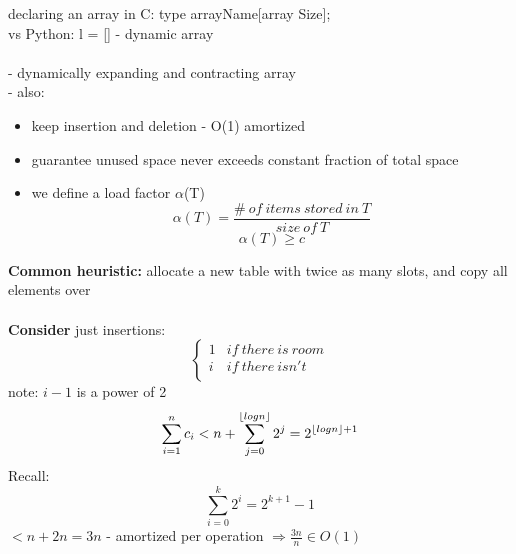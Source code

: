 \documentclass{article}
\DeclarePairedDelimiter\floor{\lfloor}{\rfloor}
\begin{document}
	declaring an array in C: type arrayName[array Size];\\
	vs Python: l = [] - dynamic array\\\\
	- dynamically expanding and contracting array\\ 
	- also: \begin{itemize}
			\item keep insertion and deletion - O(1) amortized\\
			\item guarantee unused space never exceeds constant fraction of total space\\
			\item we define a load factor $\alpha$(T)\\
			$$\alpha(T) = \frac{\#~of~items~stored~in~T}{size~of~T}$$
			$$\alpha(T) \ge c$$
	\end{itemize}
	\textbf{Common heuristic:} allocate a new table with twice as many slots, and copy all elements over\\\\
	\textbf{Consider} just insertions:\\
	\[ \begin{cases} 
	1 & if~there~is~room \\
	i & if ~there~isn't\\ 
	\end{cases}
	\]
	note: $i - 1$ is a power of 2\\
	$$\sum_{i=1}^{n}c_i < n + \sum_{j=0}^{\floor{logn}}2^j = 2^{\floor{logn} + 1}$$
	Recall:
	$$\sum_{i=0}^{k}2^i = 2^{k+1} - 1$$
	$< n + 2n = 3n$ - amortized per operation $\Rightarrow \frac{3n}{n} \in O(1)$\\\\
	
\end{document}
